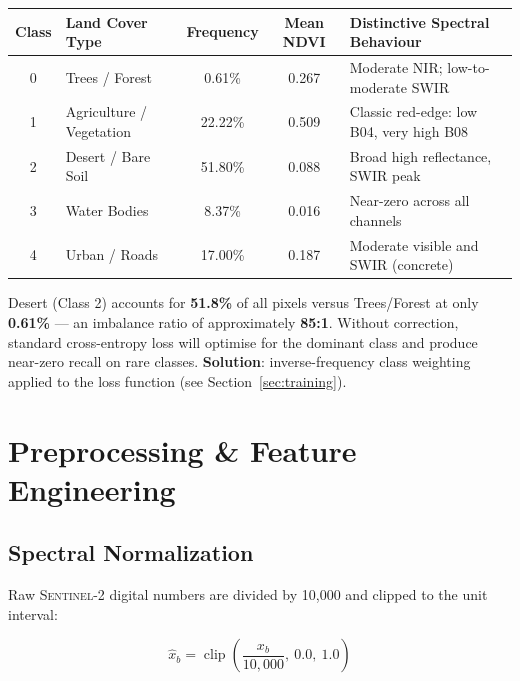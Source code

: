 \documentclass[12pt, a4paper]{article}
\newcommand{\sentinel}{\textsc{Sentinel-2}}
\begin{document}
\begin{center}
\renewcommand{\arraystretch}{1.3}
\begin{tabular}{clccp{5.2cm}}
\toprule
\textbf{Class} & \textbf{Land Cover Type} & \textbf{Frequency} & \textbf{Mean NDVI} & \textbf{Distinctive Spectral Behaviour} \\
\midrule
\rowcolor{green!7}
0 & Trees / Forest           & 0.61\%  & 0.267 & Moderate NIR; low-to-moderate SWIR \\
\rowcolor{lime!7}
1 & Agriculture / Vegetation & 22.22\% & 0.509 & Classic red-edge: low B04, very high B08 \\
\rowcolor{orange!7}
2 & Desert / Bare Soil       & 51.80\% & 0.088 & Broad high reflectance, SWIR peak \\
\rowcolor{blue!7}
3 & Water Bodies             & 8.37\%  & 0.016 & Near-zero across all channels \\
\rowcolor{gray!10}
4 & Urban / Roads            & 17.00\% & 0.187 & Moderate visible and SWIR (concrete) \\
\bottomrule
\end{tabular}
\end{center}

\begin{warnbox}
  Desert (Class 2) accounts for \textbf{51.8\%} of all pixels versus Trees/Forest at only \textbf{0.61\%} — an imbalance ratio of approximately \textbf{85:1}. Without correction, standard cross-entropy loss will optimise for the dominant class and produce near-zero recall on rare classes.
  \textbf{Solution}: inverse-frequency class weighting applied to the loss function (see Section~\ref{sec:training}).
\end{warnbox}

\section{Preprocessing \& Feature Engineering}

\subsection{Spectral Normalization}

Raw \sentinel{} digital numbers are divided by 10,000 and clipped to the unit interval:

\begin{equation}
  \hat{x}_{b} = \operatorname{clip}\!\left(\frac{x_{b}}{10{,}000},\ 0.0,\ 1.0\right)
  \label{eq:norm}
\end{equation}
\end{document}
